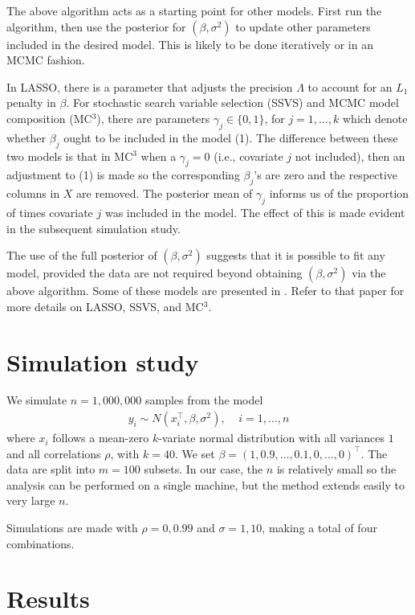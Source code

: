 \documentclass[12pt]{article}
\begin{document}
The above algorithm acts as a starting point for other models. First run the algorithm, then use the posterior for $(\beta,\sigma^2)$ to update other parameters included in the desired model. This is likely to be done iteratively or in an MCMC fashion.

In LASSO, there is a parameter that adjusts the precision $\Lambda$ to account for an $L_1$ penalty in $\beta$. For stochastic search variable selection (SSVS) and MCMC model composition (MC$^3$), there are parameters $\gamma_j\in\{0,1\}$, for $j=1,\ldots,k$ which denote whether $\beta_j$ ought to be included in the model (1). The difference between these two models is that in MC$^3$ when a $\gamma_j=0$ (i.e., covariate $j$ not included), then an adjustment to (1) is made so the corresponding $\beta_j$'s are zero and the respective columns in $X$ are removed. The posterior mean of $\gamma_j$ informs us of the proportion of times covariate $j$ was included in the model. The effect of this is made evident in the subsequent simulation study.

The use of the full posterior of $(\beta,\sigma^2)$ suggests that it is possible to fit any model, provided the data are not required beyond obtaining $(\beta,\sigma^2)$ via the above algorithm. Some of these models are presented in \cite{qian2017big}. Refer to that paper for more details on LASSO, SSVS, and MC$^3$.

\section{Simulation study}

We simulate $n=1,000,000$ samples from the model
\begin{align}
y_i \sim N(x_i^\top, \beta, \sigma^2),~~~~~i=1,\ldots,n
\end{align}
where $x_i$ follows a mean-zero $k$-variate normal distribution with all variances $1$ and all correlations $\rho$, with $k=40$. We set $\beta=(1, 0.9, \ldots, 0.1, 0, \ldots, 0)^\top$. The data are split into $m=100$ subsets. In our case, the $n$ is relatively small so the analysis can be performed on a single machine, but the method extends easily to very large $n$.

Simulations are made with $\rho=0, 0.99$ and $\sigma=1, 10$, making a total of four combinations.

\section{Results}
\end{document}
